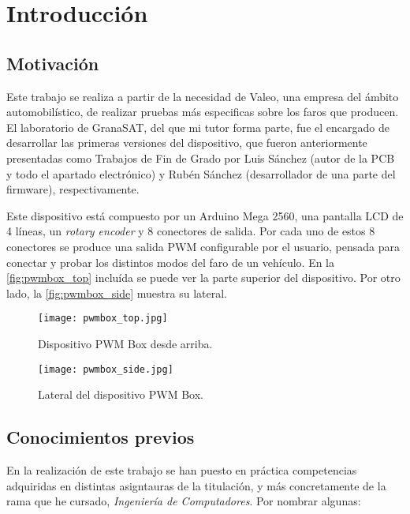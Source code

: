 \chapter{Introducción}

\section{Motivación}
\label{sec:motivacion}

Este trabajo se realiza a partir de la necesidad de Valeo, una empresa del ámbito automobilístico, de realizar pruebas más especificas sobre los faros que producen. El laboratorio de GranaSAT, del que mi tutor forma parte, fue el encargado de desarrollar las primeras versiones del dispositivo, que fueron anteriormente presentadas como Trabajos de Fin de Grado por Luis Sánchez (autor de la PCB y todo el apartado electrónico) y Rubén Sánchez (desarrollador de una parte del firmware), respectivamente.


Este dispositivo está compuesto por un Arduino Mega 2560, una pantalla LCD de 4 líneas, un \textit{rotary encoder} y 8 conectores de salida. Por cada uno de estos 8 conectores se produce una salida PWM configurable por el usuario, pensada para conectar y probar los distintos modos del faro de un vehículo. En la \autoref{fig:pwmbox_top} incluída se puede ver la parte superior del dispositivo. Por otro lado, la \autoref{fig:pwmbox_side} muestra su lateral.

\begin{figure}
    \centering
    \texttt{[image: pwmbox\_top.jpg]}
    \caption{Dispositivo PWM Box desde arriba.}
    \label{fig:pwmbox_top}
\end{figure}

\begin{figure}
    \centering
    \texttt{[image: pwmbox\_side.jpg]}
    \caption{Lateral del dispositivo PWM Box.}
    \label{fig:pwmbox_side}
\end{figure}


\section{Conocimientos previos}
\label{sec:conocimientos}

En la realización de este trabajo se han puesto en práctica competencias adquiridas en distintas asigntauras de la titulación, y más concretamente de la rama que he cursado, \emph{Ingeniería de Computadores}. Por nombrar algunas:


